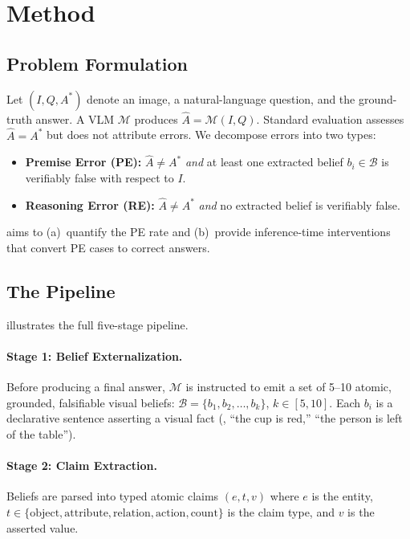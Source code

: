 \section{Method}
\label{sec:method}

\subsection{Problem Formulation}

Let $(I, Q, A^*)$ denote an image, a natural-language question, and the ground-truth
answer. A VLM $\mathcal{M}$ produces $\hat{A} = \mathcal{M}(I, Q)$. Standard
evaluation assesses $\hat{A} = A^*$ but does not attribute errors. We decompose
errors into two types:
\begin{itemize}[leftmargin=1.5em,itemsep=1pt,topsep=2pt]
  \item \textbf{Premise Error (PE):} $\hat{A} \neq A^*$ \emph{and} at least one
    extracted belief $b_i \in \mathcal{B}$ is verifiably false with respect to $I$.
  \item \textbf{Reasoning Error (RE):} $\hat{A} \neq A^*$ \emph{and} no extracted
    belief is verifiably false.
\end{itemize}
\bci{} aims to (a)~quantify the PE rate and (b)~provide inference-time interventions
that convert PE cases to correct answers.

\subsection{The \bci{} Pipeline}

 illustrates the full five-stage pipeline.

\paragraph{Stage 1: Belief Externalization.}
Before producing a final answer, $\mathcal{M}$ is instructed to emit a set of 5--10
atomic, grounded, falsifiable visual beliefs:
$\mathcal{B} = \{b_1, b_2, \ldots, b_k\}$, $k \in [5, 10]$.
Each $b_i$ is a declarative sentence asserting a visual fact (\eg, ``the cup is red,''
``the person is left of the table'').

\paragraph{Stage 2: Claim Extraction.}
Beliefs are parsed into typed atomic claims $(e, t, v)$ where $e$ is the entity,
$t \in \{\text{object}, \text{attribute}, \text{relation}, \text{action}, \text{count}\}$
is the claim type, and $v$ is the asserted value.

